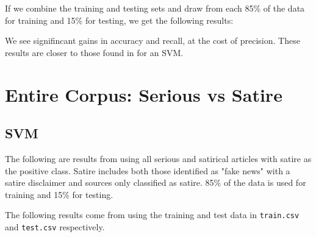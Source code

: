 \documentclass [12 pt] {report}
\begin{document}
If we combine the training and testing sets and draw from each 85\% of the data for training and 15\% for testing, we get the following results:
\vspace*{-2mm}
\begin{table}[H]
\small
{}
\label{table:Yang - Rand}
\end{table}
We see signifincant gains in accuracy and recall, at the cost of precision. These results are closer to those found in \cite{Yang} for an SVM.

\section{Entire Corpus: Serious vs Satire}
\subsection{SVM}
The following are results from using all serious and satirical articles with satire as the positive class. Satire includes both those identified as "fake news" with a satire disclaimer and sources only classified as satire. 85\% of the data is used for training and 15\% for testing. 

The following results come from using the training and test data in \texttt{train.csv} and \texttt{test.csv} respectively. 
\end{document}
